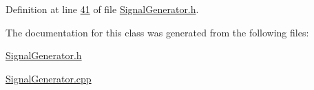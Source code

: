Definition at line \hyperlink{_signal_generator_8h_source_l00041}{41} of file \hyperlink{_signal_generator_8h_source}{Signal\+Generator.\+h}.



The documentation for this class was generated from the following files\+:\begin{DoxyCompactItemize}
\item 
\hyperlink{_signal_generator_8h}{Signal\+Generator.\+h}\item 
\hyperlink{_signal_generator_8cpp}{Signal\+Generator.\+cpp}\end{DoxyCompactItemize}
